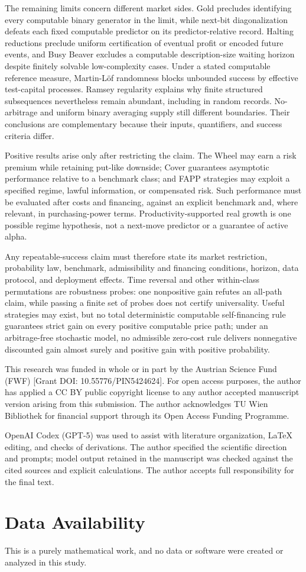 \documentclass[aps,pra,reprint,superscriptaddress,amsmath,amssymb,floatfix]{revtex4-2}
\theoremstyle{plain}
\theoremstyle{definition}
\theoremstyle{remark}
\begin{document}
The remaining limits concern different market sides. Gold precludes identifying
every computable binary generator in the limit, while next-bit diagonalization
defeats each fixed computable predictor on its predictor-relative record.
Halting reductions preclude uniform certification of eventual profit or encoded
future events, and Busy Beaver excludes a computable description-size waiting
horizon despite finitely solvable low-complexity cases. Under a stated
computable reference measure, Martin-L\"of randomness blocks unbounded success
by effective test-capital processes. Ramsey regularity explains why finite
structured subsequences nevertheless remain abundant, including in random
records. No-arbitrage and uniform binary averaging supply still different
boundaries. Their conclusions are complementary because their inputs,
quantifiers, and success criteria differ.

Positive results arise only after restricting the claim. The Wheel may earn a
risk premium while retaining put-like downside; Cover guarantees asymptotic
performance relative to a benchmark class; and FAPP strategies may exploit a
specified regime, lawful information, or compensated risk. Such performance
must be evaluated after costs and financing, against an explicit benchmark and,
where relevant, in purchasing-power terms. Productivity-supported real growth
is one possible regime hypothesis, not a next-move predictor or a guarantee of
active alpha.

Any repeatable-success claim must therefore state its market restriction,
probability law, benchmark, admissibility and financing conditions, horizon,
data protocol, and deployment effects. Time reversal and other within-class
permutations are robustness probes: one nonpositive gain refutes an all-path
claim, while passing a finite set of probes does not certify universality.
Useful strategies may exist, but no total deterministic computable
self-financing rule guarantees strict gain on every positive computable price
path; under an arbitrage-free stochastic model, no admissible zero-cost rule
delivers nonnegative discounted gain almost surely and positive gain with
positive probability.

\begin{acknowledgments}
This research was funded in whole or in part by the Austrian Science Fund
(FWF) [Grant DOI: 10.55776/PIN5424624]. For open access purposes, the author
has applied a CC BY public copyright license to any author accepted manuscript
version arising from this submission. The author acknowledges TU Wien
Bibliothek for financial support through its Open Access Funding Programme.

OpenAI Codex (GPT-5) was used to assist with literature organization, LaTeX
editing, and checks of derivations. The author specified the scientific
direction and prompts; model output retained in the manuscript was checked
against the cited sources and explicit calculations. The author accepts full
responsibility for the final text.
\end{acknowledgments}

\section*{Data Availability}
This is a purely mathematical work, and no data or software were created or
analyzed in this study.

\clearpage

\end{document}
